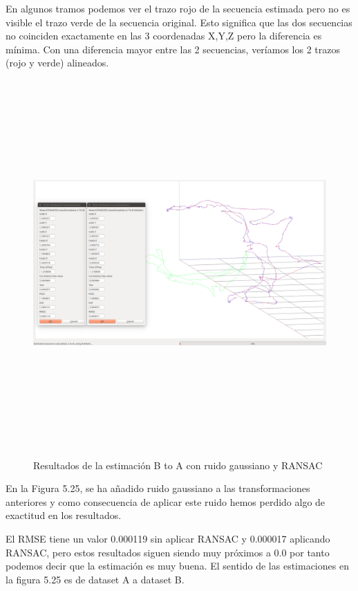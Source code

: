 En algunos tramos podemos ver el trazo rojo de la secuencia estimada pero no es visible el trazo verde de la secuencia original. Esto significa que las dos secuencias no coinciden exactamente en las 3 coordenadas X,Y,Z pero la diferencia es mínima. Con una diferencia mayor entre las 2 secuencias, veríamos los 2 trazos (rojo y verde) alineados.

\begin{figure}[H]
\begin{center}
\label{fig:opciones de View}\includegraphics[height=14.0cm,width=18.0cm]{img/cap6/newData_EscalaTraslaRotaGauss_ab.png}
\hspace{0.5cm}

\end{center}


\caption{Resultados de la estimación B to A con ruido gaussiano y RANSAC}
\end{figure}

En la Figura 5.25, se ha añadido ruido gaussiano a las transformaciones anteriores y como consecuencia de aplicar este ruido hemos perdido algo de exactitud en los resultados.

El RMSE tiene un valor 0.000119 sin aplicar RANSAC y 0.000017 aplicando RANSAC, pero estos resultados siguen siendo muy próximos a 0.0 por tanto podemos decir que la estimación es muy buena.
El sentido de las estimaciones en la figura 5.25 es de dataset A a dataset B.


